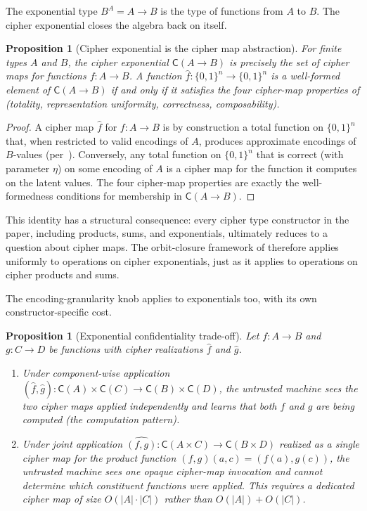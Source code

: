 \documentclass[11pt]{article}
\theoremstyle{definition}
\theoremstyle{plain}
\newtheorem{proposition}[theorem]{Proposition}
\theoremstyle{remark}
\newcommand{\fhat}{\hat{f}}
\newcommand{\cipher}[1]{\mathsf{C}(#1)}
\newcommand{\B}{\{0,1\}}
\begin{document}
The exponential type $B^A = A \to B$ is the type of functions from $A$
to $B$.
The cipher exponential closes the algebra back on itself.

\begin{proposition}[Cipher exponential is the cipher map abstraction]
\label{prop:exponential-identity}
For finite types $A$ and $B$, the cipher exponential $\cipher{A \to B}$
is precisely the set of cipher maps for functions $f : A \to B$.
A function $\fhat : \B^n \to \B^n$ is a well-formed element of
$\cipher{A \to B}$ if and only if it satisfies the four cipher-map
properties of  (totality, representation
uniformity, correctness, composability).
\end{proposition}

\begin{proof}
A cipher map $\fhat$ for $f : A \to B$ is by construction a total
function on $\B^n$ that, when restricted to valid encodings of $A$,
produces approximate encodings of $B$-values
(per~\cite{towell2026cipher}).
Conversely, any total function on $\B^n$ that is correct (with
parameter $\eta$) on some encoding of $A$ is a cipher map for the
function it computes on the latent values.
The four cipher-map properties are exactly the well-formedness
conditions for membership in $\cipher{A \to B}$.
\end{proof}

This identity has a structural consequence: every cipher type
constructor in the paper, including products, sums, and exponentials,
ultimately reduces to a question about cipher maps.
The orbit-closure framework of  therefore applies
uniformly to operations on cipher exponentials, just as it applies
to operations on cipher products and sums.

The encoding-granularity knob applies to exponentials too, with its
own constructor-specific cost.

\begin{proposition}[Exponential confidentiality trade-off]
\label{prop:exponential-tradeoff}
Let $f : A \to B$ and $g : C \to D$ be functions with cipher
realizations $\fhat$ and $\hat{g}$.
\begin{enumerate}
\item Under \emph{component-wise} application
  $(\fhat, \hat{g}) : \cipher{A} \times \cipher{C} \to
  \cipher{B} \times \cipher{D}$, the untrusted machine sees the two
  cipher maps applied independently and learns that both $f$ and $g$
  are being computed (the \emph{computation pattern}).
\item Under \emph{joint} application
  $\widehat{(f, g)} : \cipher{A \times C} \to \cipher{B \times D}$
  realized as a single cipher map for the product function
  $(f, g)(a, c) = (f(a), g(c))$, the untrusted machine sees one
  opaque cipher-map invocation and cannot determine which constituent
  functions were applied.
  This requires a dedicated cipher map of size
  $O(|A| \cdot |C|)$ rather than $O(|A|) + O(|C|)$.
\end{enumerate}
\end{proposition}
\end{document}
